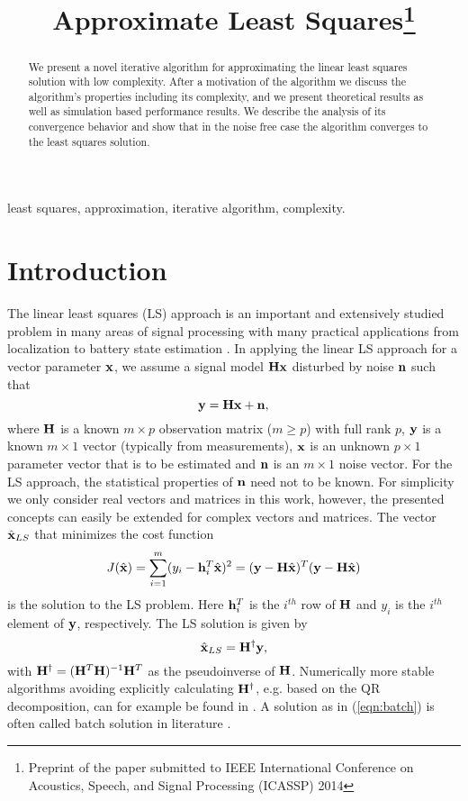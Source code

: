 \documentclass{article}
\title{Approximate Least Squares\footnote{Preprint of the paper submitted to IEEE International Conference on Acoustics, Speech, and Signal Processing (ICASSP) 2014}}
\begin{document}
\onecolumn
\maketitle
\sloppy
\begin{abstract}
We present a novel iterative algorithm for approximating the linear least squares 
solution with low complexity. 
After a motivation of the algorithm we discuss the algorithm's
properties including its complexity, and we present theoretical results as well as 
simulation based performance results.
We describe the analysis of its convergence behavior and show that in the noise free 
case the algorithm converges to the least squares solution.
\end{abstract}

\begin{keywords}
least squares, approximation, iterative algorithm, complexity.
\end{keywords}
\section{Introduction}
\label{sec:intro}
The linear least squares (LS) approach is an important and extensively
studied problem in many areas of signal processing with many 
practical applications from localization \cite{localization} 
to battery state estimation \cite{batterystate}. 
In applying the linear LS approach for a vector parameter $\bf x$,
we assume a signal model $\bf Hx$ disturbed by noise $\bf n$ such 
that
\begin{equation}
{\bf y} = {\bf Hx}  + {\bf n},
\label{eqn:systemmodel}
\end{equation}
where ${\bf H}$ is a known $m \times p$ observation matrix ($m \geq p$) with 
full rank $p$, ${\bf y}$ is a known $m \times 1$ vector 
(typically from measurements), ${\bf x}$ is an unknown $p \times 1$ parameter 
vector that is to be estimated and ${\bf n}$ is an $m \times 1$ noise vector.
For the LS approach, the statistical properties of $\bf n$ need not to be known.
For simplicity we only consider real vectors and matrices in this work, 
however, the presented concepts can  
easily be extended for complex vectors and matrices. 
The vector $\hat{\bf x}_{LS}$ that minimizes the cost function
\begin{align}
J(\hat{\bf x}) = \sum_{i=1}^m (y_i - {\bf h}_i^T \hat{\bf x})^2 = ( {\bf y} - {\bf H} \hat{\bf x} ) ^T ( {\bf y} - {\bf H} \hat{\bf x} )  
\end{align}
is the solution to the LS problem. Here 
${\bf h}_i^T$ is the $i^{th}$ row of $\bf H$ and 
$y_i$ is the $i^{th}$ element of $\bf y$, respectively. The LS 
solution is given by
\begin{equation}
\hat{\bf x}_{LS} = {\bf H}^\dag{\bf y},
\label{eqn:batch}
\end{equation}
with ${\bf H}^\dag = ({\bf H}^T{\bf H})^{-1}{\bf H}^T$ as the pseudoinverse 
of ${\bf H}$. Numerically more stable algorithms avoiding explicitly calculating ${\bf H}^\dag$, e.g. based on 
the QR decomposition, can for example be found in \cite{numeric}. 
A solution as in (\ref{eqn:batch}) is often called batch solution in literature \cite{kay}.
\end{document}
